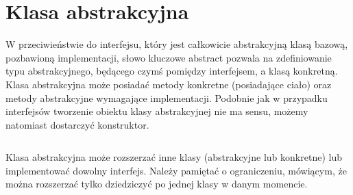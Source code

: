 \documentclass[11pt]{article}
\begin{document}
\section{Klasa abstrakcyjna}
W przeciwieństwie do interfejsu, który jest całkowicie abstrakcyjną klasą bazową, pozbawioną implementacji, słowo kluczowe abstract pozwala na zdefiniowanie typu abstrakcyjnego, będącego czymś pomiędzy interfejsem, a klasą konkretną.\\
Klasa abstrakcyjna może posiadać metody konkretne (posiadające ciało) oraz metody abstrakcyjne wymagające implementacji. Podobnie jak w przypadku interfejsów tworzenie obiektu klasy abstrakcyjnej nie ma sensu, możemy natomiast dostarczyć konstruktor.

\inputminted[bgcolor=bg]{java}{./src/w05/Polygon.java}

Klasa abstrakcyjna może rozszerzać inne klasy (abstrakcyjne lub konkretne) lub implementować dowolny interfejs. Należy pamiętać o ograniczeniu, mówiącym, że można rozszerzać tylko dziedziczyć po jednej klasy w danym momencie.

\inputminted[bgcolor=bg]{java}{./src/w05/Polygon.ext.java}
\end{document}
